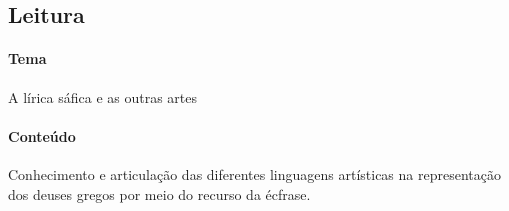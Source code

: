 \documentclass[12pt]{extarticle}
\begin{document}
\subsection{Leitura}









\paragraph{Tema} A lírica sáfica e as outras artes

\paragraph{Conteúdo} Conhecimento e articulação das diferentes linguagens
artísticas na representação dos deuses gregos por meio do recurso da écfrase.
\end{document}
